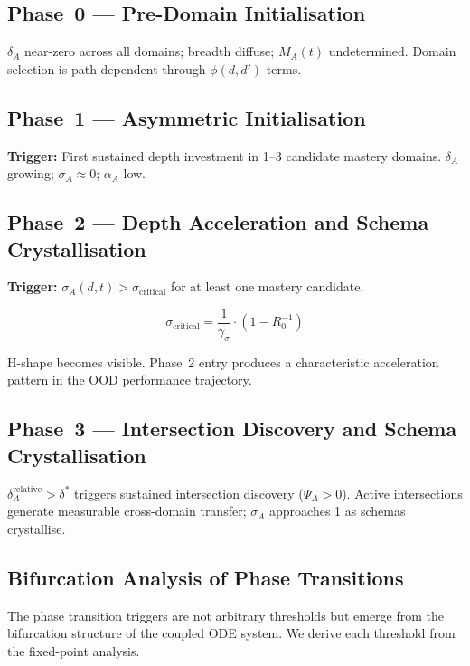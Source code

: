 \documentclass[10pt]{article}
\begin{document}
\subsection*{Phase~0 --- Pre-Domain Initialisation}

$\delta_A$ near-zero across all domains; breadth diffuse; $M_A(t)$
undetermined. Domain selection is path-dependent through $\phi(d,d')$
terms.

\subsection*{Phase~1 --- Asymmetric Initialisation}

\textbf{Trigger:} First sustained depth investment in 1--3 candidate
mastery domains. $\delta_A$ growing; $\sigma_A \approx 0$; $\alpha_A$
low.

\subsection*{Phase~2 --- Depth Acceleration and Schema Crystallisation}

\textbf{Trigger:} $\sigma_A(d,t) > \sigma_{\text{critical}}$ for at
least one mastery candidate.

\begin{equation}\label{eq:sigma-critical}
\sigma_{\text{critical}} = \frac{1}{\gamma_\sigma} \cdot (1 - R_0^{-1})
\end{equation}

H-shape becomes visible. Phase~2 entry produces a characteristic
acceleration pattern in the OOD performance trajectory.

\subsection*{Phase~3 --- Intersection Discovery and Schema Crystallisation}

$\delta_A^{\text{relative}} > \delta^*$ triggers sustained intersection
discovery ($\Psi_A > 0$). Active intersections generate measurable
cross-domain transfer; $\sigma_A$ approaches 1 as schemas crystallise.

\subsection{Bifurcation Analysis of Phase Transitions}\label{sec:bifurcation}

The phase transition triggers are not arbitrary thresholds but emerge from
the bifurcation structure of the coupled ODE system. We derive each
threshold from the fixed-point analysis.
\end{document}
